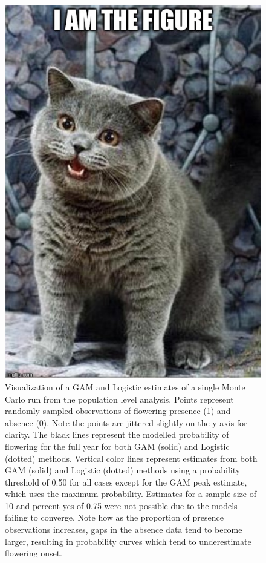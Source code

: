 \begin{figure}
	\centering
	\includegraphics[scale=0.5]{images/figure_filler.jpg}
	\caption[Visualization of a GAM and Logistic estimates of a single Monte Carlo run from the population level analysis]{Visualization of a GAM and Logistic estimates of a single Monte Carlo run from the population level analysis. Points represent randomly sampled observations of flowering presence (1) and absence (0). Note the points are jittered slightly on the y-axis for clarity. The black lines represent the modelled probability of flowering for the full year for both GAM (solid) and Logistic (dotted) methods. Vertical color lines represent estimates from both GAM (solid) and Logistic (dotted) methods using a probability threshold of 0.50 for all cases except for the GAM peak estimate, which uses the maximum probability. Estimates for a sample size of 10 and percent yes of 0.75 were not possible due to the models failing to converge. Note how as the proportion of presence observations increases, gaps in the absence data tend to become larger, resulting in probability curves which tend to underestimate flowering onset.} \label{fig-b-5}
\end{figure}